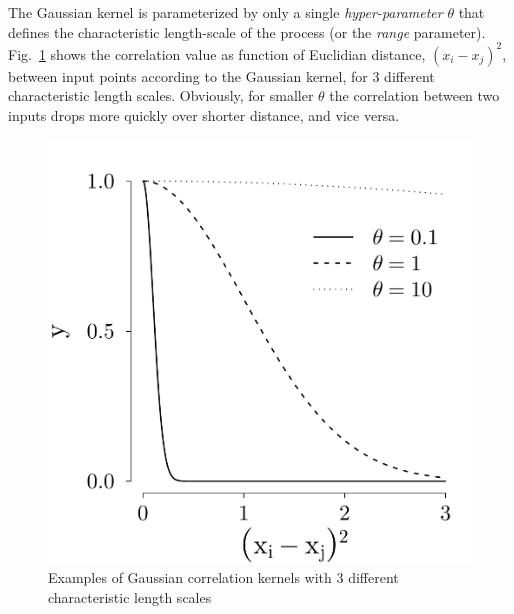 The Gaussian kernel is parameterized by only a single \emph{hyper-parameter} $\theta$ that defines the characteristic length-scale of the process (or the \emph{range} parameter).
Fig.~\ref{fig:plot_corrfun_gauss} shows the correlation value as function of Euclidian distance, $(x_i - x_j)^2$, between input points according to the Gaussian kernel, 
for 3 different characteristic length scales.
Obviously, for smaller $\theta$ the correlation between two inputs drops more quickly over shorter distance, and vice versa.
\begin{figure}[bth]
	\centering
	\includegraphics[scale=0.35]{../figures/chapter4/figures/plotCorrFunGauss.pdf}
	\caption[Gaussian correlation kernels with 3 different characteristic length scales]{Examples of Gaussian correlation kernels with 3 different characteristic length scales}
	\label{fig:plot_corrfun_gauss}
\end{figure}

